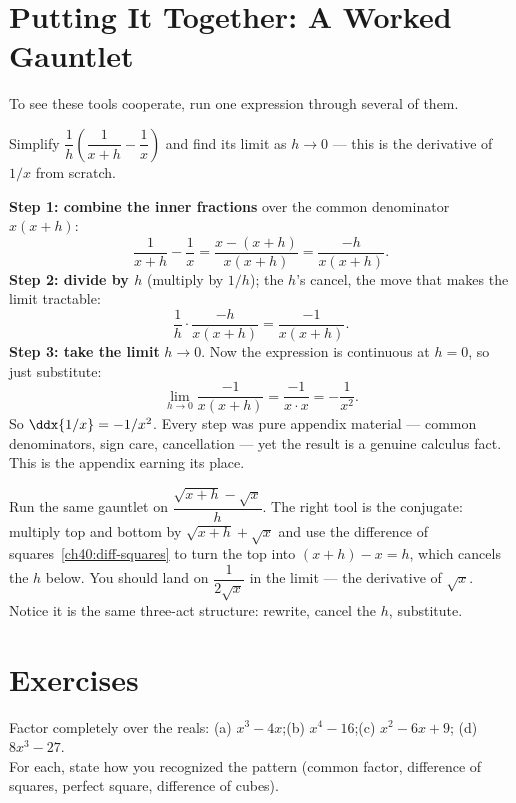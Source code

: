 \section{Putting It Together: A Worked Gauntlet}
\label{ch40:gauntlet}

To see these tools cooperate, run one expression through several of them.

\begin{example}
\label{ch40:ex-gauntlet}
Simplify $\dfrac{1}{h}\!\left(\dfrac{1}{x+h} - \dfrac{1}{x}\right)$ and find its
limit as $h\to 0$ --- this is the derivative of $1/x$ from scratch.

\textbf{Step 1: combine the inner fractions} over the common denominator
$x(x+h)$:
\[
  \frac{1}{x+h} - \frac{1}{x} = \frac{x - (x+h)}{x(x+h)} = \frac{-h}{x(x+h)}.
\]
\textbf{Step 2: divide by $h$} (multiply by $1/h$); the $h$'s cancel, the move
that makes the limit tractable:
\[
  \frac{1}{h}\cdot\frac{-h}{x(x+h)} = \frac{-1}{x(x+h)}.
\]
\textbf{Step 3: take the limit} $h \to 0$. Now the expression is continuous at
$h=0$, so just substitute:
\[
  \lim_{h\to 0} \frac{-1}{x(x+h)} = \frac{-1}{x \cdot x} = -\frac{1}{x^2}.
\]
So $\ddx{1/x} = -1/x^2$. Every step was pure appendix material --- common
denominators, sign care, cancellation --- yet the result is a genuine calculus
fact. This is the appendix earning its place.
\end{example}

\begin{labbox}
Run the same gauntlet on $\dfrac{\sqrt{x+h}-\sqrt{x}}{h}$. The right tool is the
conjugate: multiply top and bottom by $\sqrt{x+h}+\sqrt{x}$ and use the difference
of squares~\eqref{ch40:diff-squares} to turn the top into $(x+h)-x = h$, which
cancels the $h$ below. You should land on $\dfrac{1}{2\sqrt x}$ in the limit ---
the derivative of $\sqrt x$. Notice it is the same three-act structure: rewrite,
cancel the $h$, substitute.
\end{labbox}

\section*{Exercises}

\begin{exercise}
\label{ch40:exr-factor}
Factor completely over the reals:
(a) $x^3 - 4x$;\quad (b) $x^4 - 16$;\quad (c) $x^2 - 6x + 9$;\quad
(d) $8x^3 - 27$. \\
For each, state how you recognized the pattern (common factor, difference of
squares, perfect square, difference of cubes).
\end{exercise}

